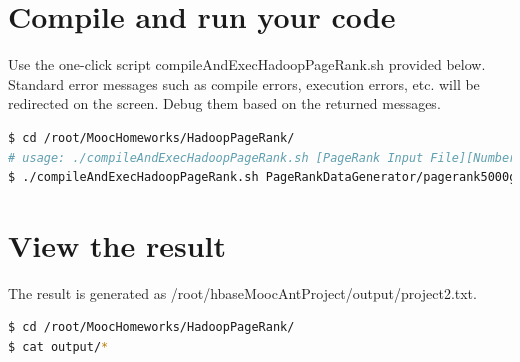 \documentclass{article}
\begin{document}
\section*{Compile and run your code}
Use the one-click script compileAndExecHadoopPageRank.sh provided below. Standard error messages such as compile errors, execution errors, etc. will be redirected on the screen. Debug them based on the returned messages.
\begin{lstlisting}[language=bash]
$ cd /root/MoocHomeworks/HadoopPageRank/
# usage: ./compileAndExecHadoopPageRank.sh [PageRank Input File][Number of Urls][Number Of Iterations]
$ ./compileAndExecHadoopPageRank.sh PageRankDataGenerator/pagerank5000g50.input.0 5000 1
\end{lstlisting}

\section*{View the result}
The result is generated as /root/hbaseMoocAntProject/output/project2.txt. 
\begin{lstlisting}[language=bash]
$ cd /root/MoocHomeworks/HadoopPageRank/
$ cat output/*
\end{lstlisting}


 
\end{document}
